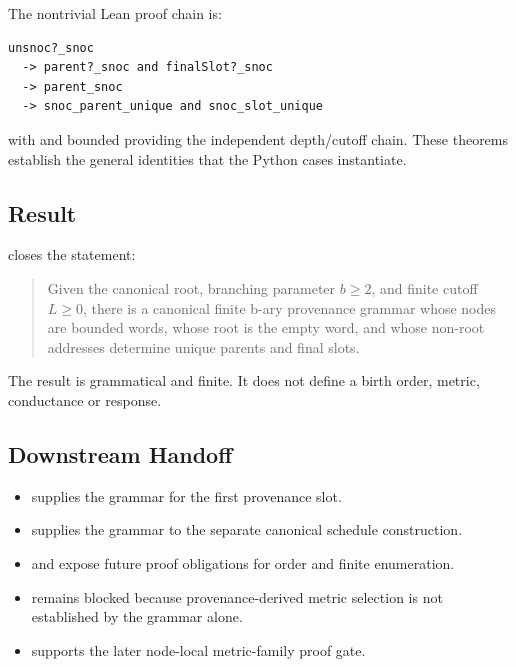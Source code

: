The nontrivial Lean proof chain is:

\begin{verbatim}
unsnoc?_snoc
  -> parent?_snoc and finalSlot?_snoc
  -> parent_snoc
  -> snoc_parent_unique and snoc_slot_unique
\end{verbatim}

with \texttt{\protect{}} and bounded \texttt{\protect{}} providing
the independent depth/cutoff chain. These theorems establish the general
identities that the Python cases instantiate.

\subsection{Result}\label{result-4}

\texttt{\protect{}} closes the statement:

\begin{quote}
Given the canonical root, branching parameter \(b\ge 2\), and finite
cutoff \(L\ge 0\), there is a canonical finite b-ary provenance grammar
whose nodes are bounded words, whose root is the empty word, and whose
non-root addresses determine unique parents and final slots.
\end{quote}

The result is grammatical and finite. It does not define a birth order,
metric, conductance or response.

\subsection{Downstream Handoff}\label{downstream-handoff-4}

\begin{itemize}
\tightlist
\item
  \texttt{\protect{}} supplies the grammar for
  the first provenance slot.
\item
  \texttt{\protect{}} supplies the grammar to
  the separate canonical schedule construction.
\item
  \texttt{\protect{}} and \texttt{\protect{}} expose future proof obligations for
  order and finite enumeration.
\item
  \texttt{\protect{}} remains blocked because
  provenance-derived metric selection is not established by the grammar
  alone.
\item
  \texttt{\protect{}} supports the later node-local metric-family proof gate.
\end{itemize}

